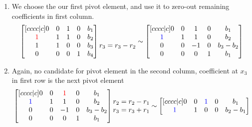 \begin{enumerate}
\item We choose the our first pivot element, and use it to zero-out remaining coefficients in first column.
\begin{equation}
\begin{bmatrix}[cccc|c]
    0 & 0 & 1 & 0 & b_1 \\
    \textcolor{red}{1} & 1 & 1 & 0 & b_2 \\ 
    1 & 1 & 0 & 0 & b_3 \\ 
    0 & 0 & 0 & 1 & b_4 \\ 
\end{bmatrix}
\begin{matrix} \\ \\ r_3 = r_3 - r_2 \\ \\ \end{matrix} \sim
\begin{bmatrix}[cccc|c]
    0 & 0 & 1 & 0 & b_1 \\
    \textcolor{blue}{1} & 1 & 1 & 0 & b_2 \\ 
    0 & 0 & -1 & 0 & b_3 - b_2 \\ 
    0 & 0 & 0 & 1 & b_1 \\ 
\end{bmatrix}
\end{equation}
\item
Again, no candidate for pivot element in the second column, coefficient at $x_3$ in first row is the next pivot element
\begin{equation}
\begin{bmatrix}[cccc|c]
    0 & 0 & \textcolor{red}{1} & 0 & b_1 \\
    \textcolor{blue}{1} & 1 & 1 & 0 & b_2 \\ 
    0 & 0 & -1 & 0 & b_3 - b_2 \\ 
    0 & 0 & 0 & 1 & b_1 \\ 
\end{bmatrix}
\begin{matrix} \\ r_2 = r_2 - r_1 \\ r_3 = r_3 + r_1 \\ \\ \end{matrix} \sim
\begin{bmatrix}[cccc|c]
    0 & 0 & \textcolor{blue}{1} & 0 & b_1 \\ 
    \textcolor{blue}{1} & 1 & 0 & 0 & b_2-b_1 \\ 

\end{bmatrix}
\end{equation}
\end{enumerate}
